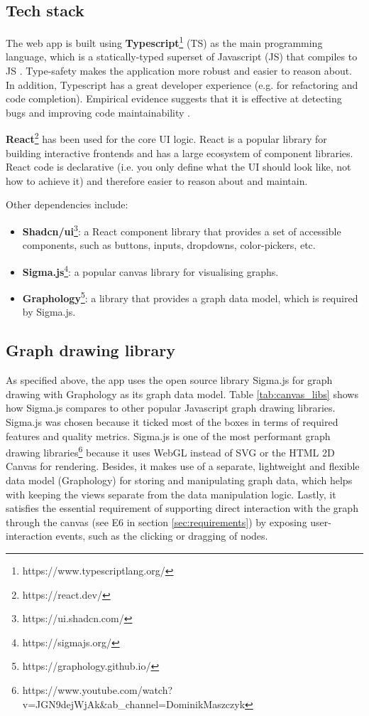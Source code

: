 \documentclass{l4proj}
\begin{document}
\subsection{Tech stack}
\label{sec:tech_stack}

The web app is built using \textbf{Typescript}\footnote{https://www.typescriptlang.org/} (TS) as the main programming language, which is a statically-typed superset of Javascript (JS) that compiles to JS \citep{typescript}. Type-safety makes the application more robust and easier to reason about. In addition, Typescript has a great developer experience (e.g. for refactoring and code completion). Empirical evidence suggests that it is effective at detecting bugs and improving code maintainability \citep{typescript_bugs_paper}.

\textbf{React}\footnote{https://react.dev/} has been used for the core UI logic. React is a popular library for building interactive frontends and has a large ecosystem of component libraries. React code is declarative (i.e. you only define what the UI should look like, not how to achieve it) and therefore easier to reason about and maintain.

Other dependencies include:
\begin{itemize}
    \item \textbf{Shadcn/ui}\footnote{https://ui.shadcn.com/}: a React component library that provides a set of accessible components, such as buttons, inputs, dropdowns, color-pickers, etc.
    \item \textbf{Sigma.js}\footnote{https://sigmajs.org/}: a popular canvas library for visualising graphs.
    \item \textbf{Graphology}\footnote{https://graphology.github.io/}: a library that provides a graph data model, which is required by Sigma.js.
\end{itemize}



\subsection{Graph drawing library}
As specified above, the app uses the open source library Sigma.js for graph drawing with Graphology as its graph data model. Table \ref{tab:canvas_libs} shows how Sigma.js compares to other popular Javascript graph drawing libraries. Sigma.js was chosen because it ticked most of the boxes in terms of required features and quality metrics.
Sigma.js is one of the most performant graph drawing libraries\footnote{https://www.youtube.com/watch?v=JGN9dejWjAk\&ab\_channel=DominikMaszczyk} because it uses WebGL instead of SVG or the HTML 2D Canvas for rendering. Besides, it makes use of a separate, lightweight and flexible data model (Graphology) for storing and manipulating graph data, which helps with keeping the views separate from the data manipulation logic.
Lastly, it satisfies the essential requirement of supporting direct interaction with the graph through the canvas (see E6 in section \ref{sec:requirements}) by exposing user-interaction events, such as the clicking or dragging of nodes.
\end{document}
